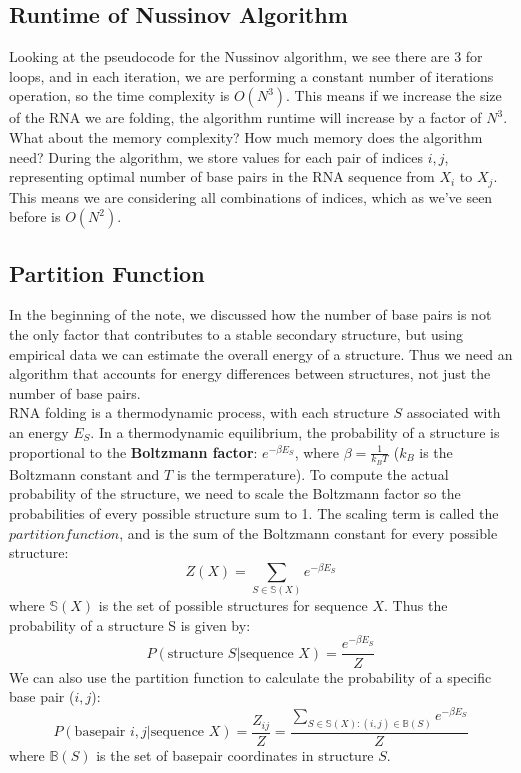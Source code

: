 \documentclass[12pt]{article}
\begin{document}
\subsection{Runtime of Nussinov Algorithm}
Looking at the pseudocode for the Nussinov algorithm, we see there are 3 for loops, and in each iteration, we are performing a constant number of iterations operation, so the time complexity is \textbf{$O(N^3)$}. This means if we increase the size of the RNA we are folding, the algorithm runtime will increase by a factor of $N^3$. What about the memory complexity? How much memory does the algorithm need? During the algorithm, we store values for each pair of indices $i, j$, representing optimal number of base pairs in the RNA sequence from $X_i$ to $X_j$. This means we are considering all combinations of indices, which as we've seen before is $O(N^2)$.
\subsection{Partition Function}
\label{partition}
In the beginning of the note, we discussed how the number of base pairs is not the only factor that contributes to a stable secondary structure, but using empirical data we can estimate the overall energy of a structure. Thus we need an algorithm that accounts for energy differences between structures, not just the number of base pairs.\\[10pt]
RNA folding is a thermodynamic process, with each structure $S$ associated with an energy $E_S$. In a thermodynamic equilibrium, the probability of a structure is proportional to the \textbf{Boltzmann factor}: $e^{-\beta E_S}$, where $\beta = \frac{1}{k_BT}$ ($k_B$ is the Boltzmann constant and $T$ is the termperature). To compute the actual probability of the structure, we need to scale the Boltzmann factor so the probabilities of every possible structure sum to 1. The scaling term is called the $partition function$, and is the sum of the Boltzmann constant for every possible structure:
$$Z\left(X\right) = \sum_{S\in \mathbb{S}(X)}e^{-\beta E_S}$$
where $\mathbb{S}(X)$ is the set of possible structures for sequence $X$. Thus the probability of a structure S is given by:
$$P(\text{structure } S | \text{sequence }X) = \frac{e^{-\beta E_S}}{Z}$$
We can also use the partition function to calculate the probability of a specific base pair ($i,j$):
$$P(\text{basepair } i,j | \text{sequence }X) = \frac{Z_{ij}}{Z} = \frac{\sum\limits_{S\in \mathbb{S}(X):(i,j)\in \mathbb{B}(S)}e^{-\beta E_S}}{Z}$$
where $\mathbb{B}(S)$ is the set of basepair coordinates in structure $S$.
\end{document}

